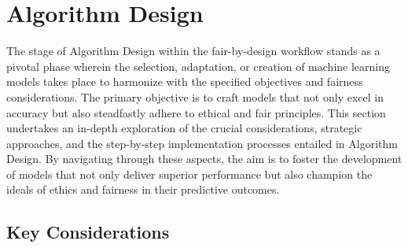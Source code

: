 \section{Algorithm Design}
\label{section: algorithm-design}

The stage of Algorithm Design within the fair-by-design workflow stands as a pivotal phase wherein the selection, adaptation, or creation of machine learning models takes place to harmonize with the specified objectives and fairness considerations. The primary objective is to craft models that not only excel in accuracy but also steadfastly adhere to ethical and fair principles. This section undertakes an in-depth exploration of the crucial considerations, strategic approaches, and the step-by-step implementation processes entailed in Algorithm Design. By navigating through these aspects, the aim is to foster the development of models that not only deliver superior performance but also champion the ideals of ethics and fairness in their predictive outcomes.

\subsection{Key Considerations}

